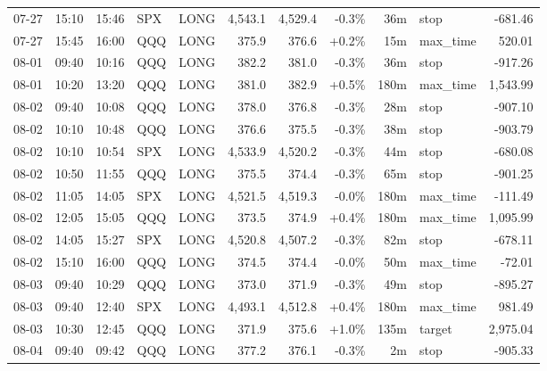 \documentclass[11pt,a4paper,twoside]{article}
\begin{document}
\begin{center}
\begin{longtable}{>{\color{txtmain}}l l l l l r r r r >{\color{txtmain}}l r}
07-27 & 15:10 & 15:46 & SPX & LONG & 4,543.1 & 4,529.4 & \textcolor{lossred}{-0.3\%} & 36m & stop & \textcolor{lossred}{-681.46} \\
07-27 & 15:45 & 16:00 & QQQ & LONG & 375.9 & 376.6 & \textcolor{wingreen}{+0.2\%} & 15m & max\_time & \textcolor{wingreen}{520.01} \\
08-01 & 09:40 & 10:16 & QQQ & LONG & 382.2 & 381.0 & \textcolor{lossred}{-0.3\%} & 36m & stop & \textcolor{lossred}{-917.26} \\
08-01 & 10:20 & 13:20 & QQQ & LONG & 381.0 & 382.9 & \textcolor{wingreen}{+0.5\%} & 180m & max\_time & \textcolor{wingreen}{1,543.99} \\
08-02 & 09:40 & 10:08 & QQQ & LONG & 378.0 & 376.8 & \textcolor{lossred}{-0.3\%} & 28m & stop & \textcolor{lossred}{-907.10} \\
08-02 & 10:10 & 10:48 & QQQ & LONG & 376.6 & 375.5 & \textcolor{lossred}{-0.3\%} & 38m & stop & \textcolor{lossred}{-903.79} \\
08-02 & 10:10 & 10:54 & SPX & LONG & 4,533.9 & 4,520.2 & \textcolor{lossred}{-0.3\%} & 44m & stop & \textcolor{lossred}{-680.08} \\
08-02 & 10:50 & 11:55 & QQQ & LONG & 375.5 & 374.4 & \textcolor{lossred}{-0.3\%} & 65m & stop & \textcolor{lossred}{-901.25} \\
08-02 & 11:05 & 14:05 & SPX & LONG & 4,521.5 & 4,519.3 & \textcolor{lossred}{-0.0\%} & 180m & max\_time & \textcolor{lossred}{-111.49} \\
08-02 & 12:05 & 15:05 & QQQ & LONG & 373.5 & 374.9 & \textcolor{wingreen}{+0.4\%} & 180m & max\_time & \textcolor{wingreen}{1,095.99} \\
08-02 & 14:05 & 15:27 & SPX & LONG & 4,520.8 & 4,507.2 & \textcolor{lossred}{-0.3\%} & 82m & stop & \textcolor{lossred}{-678.11} \\
08-02 & 15:10 & 16:00 & QQQ & LONG & 374.5 & 374.4 & \textcolor{lossred}{-0.0\%} & 50m & max\_time & \textcolor{lossred}{-72.01} \\
08-03 & 09:40 & 10:29 & QQQ & LONG & 373.0 & 371.9 & \textcolor{lossred}{-0.3\%} & 49m & stop & \textcolor{lossred}{-895.27} \\
08-03 & 09:40 & 12:40 & SPX & LONG & 4,493.1 & 4,512.8 & \textcolor{wingreen}{+0.4\%} & 180m & max\_time & \textcolor{wingreen}{981.49} \\
08-03 & 10:30 & 12:45 & QQQ & LONG & 371.9 & 375.6 & \textcolor{wingreen}{+1.0\%} & 135m & target & \textcolor{wingreen}{2,975.04} \\
08-04 & 09:40 & 09:42 & QQQ & LONG & 377.2 & 376.1 & \textcolor{lossred}{-0.3\%} & 2m & stop & \textcolor{lossred}{-905.33} \\

\end{longtable}
\end{center}
\end{document}
